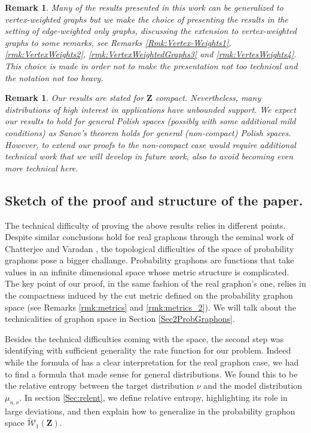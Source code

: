 \documentclass[12pt,twoside,a4paper]{article}
\newtheorem{remark}[theorem]{Remark}
\newcommand{\Space}{\mathbf{Z}}
\newcommand{\UGraphon}{\widetilde{\mathcal{W}}_1}
\begin{document}
\begin{remark}
    Many of the results presented in this work can be generalized to vertex-weighted graphs but we make the choice of presenting the results in the setting of edge-weighted only graphs, discussing the extension to vertex-weighted graphs to some remarks, see Remarks \ref{Rmk:Vertex-Weights1}, \ref{rmk:VertexWeights2}, \ref{rmk:VertexWeightedGraphs3} and \ref{rmk:VertesWeights4}. This choice is made in order not to make the presentation not too technical and the notation not too heavy. 
\end{remark}



\begin{remark}
\label{Rmk:WhyCompact}
Our results are stated for $\Space$ compact. Nevertheless, many distributions of high interest in applications have unbounded support. We expect our results to hold for general Polish spaces (possibly with some additional mild conditions) as Sanov's theorem holds for general (non-compact) Polish spaces. However, to extend our proofs to the non-compact case would require additional technical work that we will develop in future work, also to avoid becoming even more technical here.  
\end{remark}


\subsection{Sketch of the proof and structure of the paper.}
The technical difficulty of proving the above results relies in different points. Despite similar conclusions hold for real graphons through the seminal work of Chatterjee and Varadan \cite{ChatterjeeVaradhan2011}, the topological difficulties of the space of probability graphons pose a bigger challange. Probability graphons are functions that take values in an infinite dimensional space whose metric structure is complicated. The key point of our proof, in the same fashion of the real graphon's one, relies in the compactness induced by the cut metric defined on the probability graphon space (see Remarks \ref{rmk:metrics} and \ref{rmk:metrics_2}). We will talk about the technicalities of graphon space in Section \ref{Sec2ProbGraphons}. 

Besides the technical difficulties coming with the space, the second step was identifying with sufficient generality the rate function for our problem. Indeed while the formula of \cite{ChatterjeeVaradhan2011} has a clear interpretation for the real graphon case, we had to find a formula that made sense for general distributions. We found this to be the relative entropy between the target distribution $\nu$ and the model distribution $\mu_{n,\nu}$. In section \ref{Sec:relent}, we define relative entropy, highlighting its role in large deviations, and then explain how to generalize in the probability graphon space $\UGraphon(\Space)$. 
\end{document}

